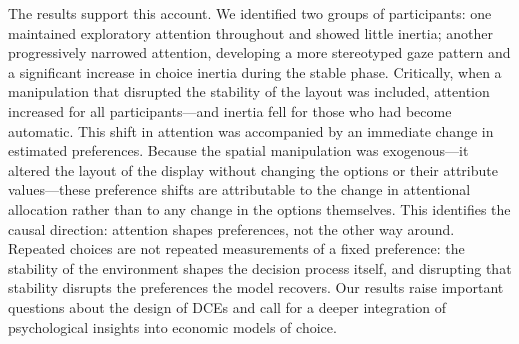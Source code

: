 The results support this account. We identified two groups of participants: one maintained exploratory attention throughout and showed little inertia; another progressively narrowed attention, developing a more stereotyped gaze pattern and a significant increase in choice inertia during the stable phase. Critically, when a manipulation that disrupted the stability of the layout was included, attention increased for all participants---and inertia fell for those who had become automatic. This shift in attention was accompanied by an immediate change in estimated preferences. Because the spatial manipulation was exogenous---it altered the layout of the display without changing the options or their attribute values---these preference shifts are attributable to the change in attentional allocation rather than to any change in the options themselves. This identifies the causal direction: attention shapes preferences, not the other way around. Repeated choices are not repeated measurements of a fixed preference: the stability of the environment shapes the decision process itself, and disrupting that stability disrupts the preferences the model recovers. Our results raise important questions about the design of DCEs and call for a deeper integration of psychological insights into economic models of choice.